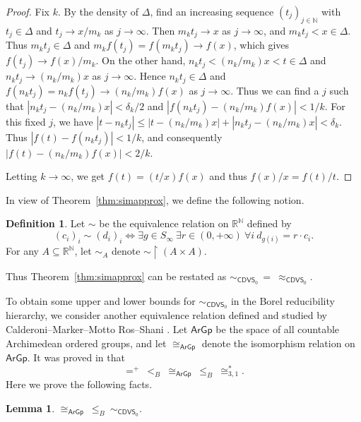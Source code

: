 \documentclass{amsart}
\newtheorem{lemma}[theorem]{Lemma}
\theoremstyle{definition}
\newtheorem{definition}{Definition}[section]
\theoremstyle{remark}
\begin{document}
\begin{proof}
    Fix $k$. By the density of $\Delta$, find an increasing sequence $(t_j)_{j\in \mathbb{N}}$ with $t_j \in \Delta$ and $t_j \to x/m_k$ as $j \to\infty$. Then $m_kt_j \to x$ as $j \to \infty$, and $m_kt_j < x \in \Delta$. Thus $m_kt_j\in \Delta$ and $m_kf(t_j)=f(m_kt_j) \to f(x)$, which gives $f(t_j) \to f(x)/m_k$. On the other hand, $n_kt_j < (n_k/m_k)x < t \in \Delta$ and $n_kt_j \to (n_k/m_k)x$ as $j\to\infty$. Hence $n_kt_j\in \Delta$ and $f(n_kt_j)=n_kf(t_j) \to (n_k/m_k)f(x)$ as $j \to \infty$. 
    Thus we can find a $j$ such that $|n_kt_j-(n_k/m_k)x|<\delta_k/2$ and $|f(n_kt_j)-(n_k/m_k)f(x)|<1/k$. For this fixed $j$, we have $|t-n_kt_j|\leq |t-(n_k/m_k)x|+|n_kt_j-(n_k/m_k)x|<\delta_k$. Thus $|f(t)-f(n_kt_j)|<1/k$, and consequently $|f(t)-(n_k/m_k)f(x)|<2/k$. 

    Letting $k \to \infty$, we get $f(t)=(t/x)f(x)$ and thus $f(x)/x=f(t)/t$. 
\end{proof}



    


   
     
     
     In view of Theorem~\ref{thm:simapprox}, we define the following notion.
\begin{definition}\label{def:er2} Let $\sim$ be the equivalence relation on $\mathbb{R}^{\mathbb{N}}$ defined by
$$ (c_i)_i\sim (d_i)_i\iff \exists g\in S_\infty\ \exists r\in (0,+\infty)\ \forall i\ d_{g(i)}=r\cdot c_i. $$
For any $A\subseteq \mathbb{R}^{\mathbb{N}}$, let $\sim_A$ denote $\sim\upharpoonright (A\times A)$.
\end{definition}

Thus Theorem~\ref{thm:simapprox} can be restated as
$\sim_{\mathsf{CDVS}_0}\,=\ \approx_{\mathsf{CDVS}_0}$. 

To obtain some upper and lower bounds for $\sim_{\mathsf{CDVS}_0}$ in the Borel reducibility hierarchy, we consider another equivalence relation defined and studied by Calderoni--Marker--Motto Ros--Shani \cite{CMMRS}. Let $\mathsf{ArGp}$ be the space of all countable Archimedean ordered groups, and let $\cong_{\mathsf{ArGp}}$ denote the isomorphism relation on $\mathsf{ArGp}$. It was proved in \cite{CMMRS} that
$$ =^+\ <_B\ \cong_{\mathsf{ArGp}}\ \leq_B\ \cong^*_{3,1}. $$
Here we prove the following facts.

\begin{lemma}\label{lem:argp} $\cong_{\mathsf{ArGp}}\ \leq_B\ \sim_{\mathsf{CDVS}_0}$.
\end{lemma}
\end{document}
